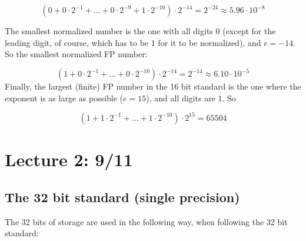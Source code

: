 \documentclass[]{book}
\theoremstyle{definition}
\theoremstyle{definition}
\theoremstyle{definition}
\theoremstyle{remark}
\begin{document}
\[
\left(0 + 0\cdot 2^{-1} + ... + 0\cdot 2^{-9} + 1\cdot 2^{-10}\right)\cdot 2^{-14} = 2^{-24} \approx 5.96\cdot 10^{-8}
\]

The smallest normalized number is the one with all digits \(0\) (except
for the leading digit, of course, which has to be \(1\) for it to be
normalized), and \(e = -14\). So the smallest normalized FP number:

\[
\left(1 + 0\cdot 2^{-1} + ... + 0\cdot 2^{-10}\right)\cdot 2^{-14} = 2^{-14} \approx 6.10\cdot 10^{-5}
\] Finally, the largest (finite) FP number in the 16 bit standard is the
one where the exponent is as large as possible (\(e = 15\)), and all
digits are \(1\). So

\[
\left(1 + 1\cdot 2^{-1} + ... + 1\cdot 2^{-10}\right)\cdot 2^{15} = 65504
\]

\section*{Lecture 2: 9/11}\label{lecture-2-911}

\subsection{The 32 bit standard (single
precision)}\label{the-32-bit-standard-single-precision}

The 32 bits of storage are used in the following way, when following the
32 bit standard:
\end{document}
